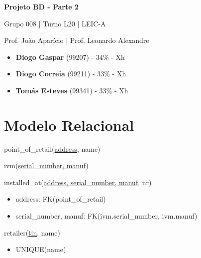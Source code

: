 \documentclass[12pt,a4paper]{article}
\begin{document}
  \begin{titlepage}
    \begin{center}
      \vspace*{5cm}

      \Huge
      \textbf{Projeto BD - Parte 2}

      \vspace{0.5cm}
      \LARGE
      Grupo 008 | Turno L20 | LEIC-A

      \vspace{0.5cm}
      \large
      Prof. João Aparício | Prof. Leonardo Alexandre

      \vfill
    \end{center}
    \large
    \begin{itemize}
      \item[] \textbf{Diogo Gaspar} (99207) - 34\% - Xh
      \item[] \textbf{Diogo Correia} (99211) - 33\% - Xh
      \item[] \textbf{Tomás Esteves} (99341) - 33\% - Xh
    \end{itemize}
  \end{titlepage}

  \section*{Modelo Relacional}

  \ttfamily

  \noindent
  point\_of\_retail(\underline{address}, name)
  
  \vspace*{10pt}

  \noindent
  ivm(\underline{serial\_number, manuf})

  \vspace*{10pt}

  \noindent
  installed\_at(\underline{address, serial\_number, manuf}, nr)
  \begin{itemize}[nosep]
    \item address: FK(point\_of\_retail)
    \item serial\_number, manuf: FK(ivm.serial\_number, ivm.manuf)
  \end{itemize}

  \vspace*{10pt}

  \noindent
  retailer(\underline{tin}, name)
  \begin{itemize}[nosep]
    \item UNIQUE(name)
  \end{itemize}
\end{document}
